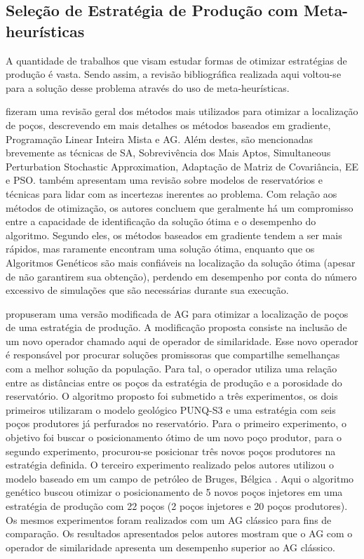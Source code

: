 \subsection{Seleção de Estratégia de Produção com Meta-heurísticas}

A quantidade de trabalhos que visam estudar formas de otimizar estratégias de produção é vasta. Sendo assim, a revisão bibliográfica realizada aqui voltou-se para a solução desse problema através do uso de meta-heurísticas.

 fizeram uma revisão geral dos métodos mais utilizados para otimizar a localização de poços, descrevendo em mais detalhes os métodos baseados em gradiente, Programação Linear Inteira Mista e AG. Além destes, são mencionadas brevemente as técnicas de SA, Sobrevivência dos Mais Aptos, Simultaneous Perturbation Stochastic Approximation, Adaptação de Matriz de Covariância, EE e PSO.  também apresentam uma revisão sobre modelos de reservatórios e técnicas para lidar com as incertezas inerentes ao problema. Com relação aos métodos de otimização, os autores concluem que geralmente há um compromisso entre a capacidade de identificação da solução ótima e o desempenho do algoritmo. Segundo eles, os métodos baseados em gradiente tendem a ser mais rápidos, mas raramente encontram uma solução ótima, enquanto que os Algoritmos Genéticos são mais confiáveis na localização da solução ótima (apesar de não garantirem sua obtenção), perdendo em desempenho por conta do número excessivo de simulações que são necessárias durante sua execução.

 propuseram uma versão modificada de AG para otimizar a localização de poços de uma estratégia de produção. A modificação proposta consiste na inclusão de um novo operador chamado aqui de operador de similaridade. Esse novo operador é responsável por procurar soluções promissoras que compartilhe semelhanças com a melhor solução da população. Para tal, o operador utiliza uma relação entre as distâncias entre os poços da estratégia de produção e a porosidade do reservatório. O algoritmo proposto foi submetido a três experimentos, os dois primeiros utilizaram o modelo geológico PUNQ-S3 \cite{Floris2001} e uma estratégia com seis poços produtores já perfurados no reservatório. Para o primeiro experimento, o objetivo foi buscar o posicionamento ótimo de um novo poço produtor, para o segundo experimento, procurou-se posicionar três novos poços produtores na estratégia definida. O terceiro experimento realizado pelos autores utilizou o modelo baseado em um campo de petróleo de Bruges, Bélgica \cite{Peters2010}. Aqui o algoritmo genético buscou otimizar o posicionamento de 5 novos poços injetores em uma estratégia de produção com 22 poços (2 poços injetores e 20 poços produtores). Os mesmos experimentos foram realizados com um AG clássico para fins de comparação. Os resultados apresentados pelos autores mostram que o AG com o operador de similaridade apresenta um desempenho superior ao AG clássico.

